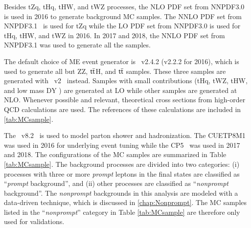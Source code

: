 Besides tZq, tHq, tHW, and tWZ processes, the \ac{NLO} \ac{PDF} set from NNPDF3.0~\cite{NNPDF:2014otw} is used in 2016 to generate background \ac{MC} samples. The \ac{NNLO} \ac{PDF} set from NNPDF3.1~\cite{NNPDF:2017mvq} is used for tZq while the \ac{LO} \ac{PDF} set from NNPDF3.0 is used for tHq, tHW, and tWZ in 2016. In 2017 and 2018, the \ac{NNLO} \ac{PDF} set from NNPDF3.1 was used to generate all the samples. 

The default choice of \ac{ME} event generator is \MG~v2.4.2 (v2.2.2 for 2016), which is used to generate all but ZZ, $\textsf{t}\overline{\textsf{t}}$H, and $\textsf{t}\overline{\textsf{t}}$ samples. These three samples are generated with \Pow~v2~\cite{Frixione:2007vw} instead. Samples with small contributions (tHq, tWZ, tHW, and low mass \ac{DY} ) are generated at \ac{LO} while other samples are generated at \ac{NLO}. Whenever possible and relevant, theoretical cross sections from high-order \ac{QCD} calculations are used. The references of these calculations are included in \ref{tab:MCsample}.

The \PY~v8.2~\cite{Sjostrand:2014zea} is used to model parton shower and hadronization. The CUETP8M1~\cite{CMS:2015wcf} was used in 2016 for underlying event tuning while the CP5~\cite{CMS:2019csb} was used in 2017 and 2018. The configurations of the \ac{MC} samples are summarized in Table \ref{tab:MCsample}. The background processes are divided into two categories: (i) processes with three or more \emph{prompt} leptons in the final states are classified as ``\emph{prompt} background'', and (ii) other processes are classified as ``\emph{nonprompt} background''. The \emph{nonprompt} backgrounds in this analysis are modeled with a data-driven technique, which is discussed in \autoref{chap:Nonprompt}. The \ac{MC} samples listed in the ``\emph{nonprompt}'' category in Table \ref{tab:MCsample} are therefore only used for validations. 

